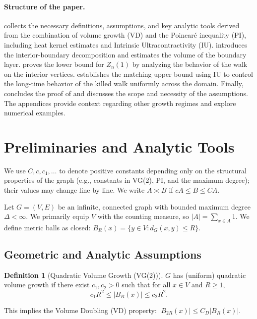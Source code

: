 \documentclass[12pt]{amsart}
\theoremstyle{definition}
\newtheorem{definition}[theorem]{Definition}
\theoremstyle{remark}
\begin{document}
\paragraph{Structure of the paper.}  collects the necessary definitions, assumptions, and key analytic tools derived from the combination of volume growth (VD) and the Poincaré inequality (PI), including heat kernel estimates and Intrinsic Ultracontractivity (IU).  introduces the interior-boundary decomposition and estimates the volume of the boundary layer.  proves the lower bound for $Z_n(1)$ by analyzing the behavior of the walk on the interior vertices.  establishes the matching upper bound using IU to control the long-time behavior of the killed walk uniformly across the domain. Finally,  concludes the proof of  and discusses the scope and necessity of the assumptions. The appendices provide context regarding other growth regimes and explore numerical examples.

\section{Preliminaries and Analytic Tools}\label{sec:prelim}

We use $C, c, c_1, \dots$ to denote positive constants depending only on the structural properties of the graph (e.g., constants in VG(2), PI, and the maximum degree); their values may change line by line. We write $A \asymp B$ if $c A \leq B \leq C A$.

Let $G = (V,E)$ be an infinite, connected graph with bounded maximum degree $\Delta < \infty$. We primarily equip $V$ with the counting measure, so $|A| = \sum_{x \in A} 1$. We define metric balls as closed: $B_R(x) = \{y \in V : d_G(x,y) \leq R\}$.

\subsection{Geometric and Analytic Assumptions}

\begin{definition}[Quadratic Volume Growth (VG(2))]
$G$ has (uniform) quadratic volume growth if there exist $c_1, c_2 > 0$ such that for all $x \in V$ and $R \geq 1$,
\begin{equation}\label{eq:quad}
c_1 R^{2} \leq |B_R(x)| \leq c_2 R^{2}.
\end{equation}
\end{definition}
This implies the Volume Doubling (VD) property: $|B_{2R}(x)| \leq C_D |B_R(x)|$.
\end{document}
